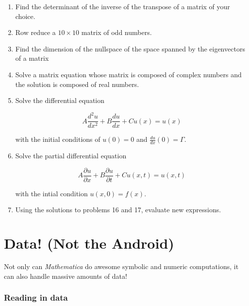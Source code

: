 \documentclass[11pt,a4paper,twoside]{article}
\begin{document}
\begin{enumerate}
				\item %
				
					Find the determinant of the inverse of the transpose of a matrix of your choice.
					
				\item %
				
					Row reduce a $10 \times 10$ matrix of odd numbers.
					
				\item %
				
					Find the dimension of the nullspace of the space spanned by the eigenvectors of a matrix
					
				\item %
				
					Solve a matrix equation whose matrix is composed of complex numbers and the solution is composed of real numbers.
					
				\item %
				
					Solve the differential equation 
					
					\[ A \frac{d^2 u}{d x^2} + B \frac{d u}{d x} + C u(x) = u(x) \]
					
					with the initial conditions of $u(0) = 0$ and $\frac{du}{dx}(0) = \Gamma $.
					
				\item %
				
					Solve the partial differential equation
					
					\[ A \frac{\partial u}{\partial x} + B \frac{\partial u}{\partial t} + C u(x,t) = u(x,t) \]
					
					with the intial condition $ u(x,0) = f(x) $.
					
				\item %
				
					Using the solutions to problems 16 and 17, evaluate new expressions.
			
			\end{enumerate}
			
\newpage
				
	\part{Data! (Not the Android)}
	
		Not only can \textit{Mathematica} do awesome symbolic and numeric computations, it can also handle massive amounts of data!
		
		\section{Reading in data}
		
\end{document}
